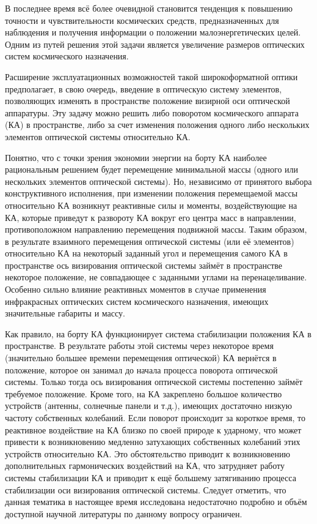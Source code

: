 
{\actuality} В последнее время всё более очевидной становится тенденция к повышению точности и чувствительности космических средств, предназначенных для наблюдения и получения информации о положении малоэнергетических целей. Одним из путей решения этой задачи является увеличение размеров оптических систем космического назначения.

Расширение эксплуатационных возможностей такой широкоформатной оптики предполагает, в свою очередь, введение в оптическую систему элементов, позволяющих изменять в пространстве положение визирной оси оптической аппаратуры. Эту задачу можно решить либо поворотом космического аппарата (КА) в пространстве, либо за счет изменения положения одного либо нескольких элементов оптической системы относительно КА. 


Понятно, что с точки зрения экономии энергии на борту КА наиболее рациональным решением будет перемещение минимальной массы (одного или нескольких элементов оптической системы). Но, независимо от принятого выбора конструктивного исполнения, при изменении положения перемещаемой массы относительно КА возникнут реактивные силы и моменты, воздействующие на КА, которые приведут к развороту КА вокруг его центра масс в направлении, противоположном направлению перемещения подвижной массы. Таким образом, в результате взаимного перемещения оптической системы (или её элементов) относительно КА на некоторый заданный угол и перемещения самого КА в пространстве ось визирования оптической системы займёт в пространстве некоторое положение, не совпадающее с заданными углами на перенацеливание.  Особенно сильно влияние реактивных моментов в случае применения инфракрасных оптических систем космического назначения, имеющих значительные габариты и массу. 

Как правило, на борту КА функционирует система стабилизации положения КА в пространстве. В результате работы этой системы через некоторое время (значительно большее времени перемещения оптической) КА вернётся в положение, которое он занимал до начала процесса поворота оптической системы. Только тогда ось визирования оптической системы постепенно займёт требуемое положение. Кроме того, на КА закреплено большое количество устройств (антенны, солнечные панели и т.д.), имеющих достаточно низкую частоту собственных колебаний. Если поворот происходит за короткое время, то реактивное воздействие на КА близко по своей природе к ударному, что может привести к возникновению медленно затухающих собственных колебаний этих устройств относительно КА. Это обстоятельство приводит к возникновению дополнительных гармонических воздействий на КА, что затрудняет работу системы стабилизации КА и приводит к ещё большему затягиванию процесса стабилизации оси визирования оптической системы.
Следует отметить, что данная тематика в настоящее время исследована недостаточно подробно и объём доступной научной литературы по данному вопросу ограничен.


